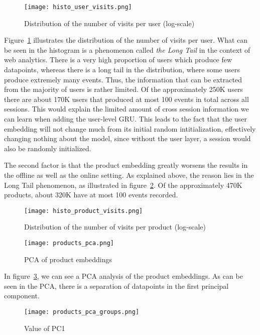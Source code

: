 \begin{figure}[t]
	\centering
	\captionsetup{width=0.8\textwidth}
    \texttt{[image: histo\_user\_visits.png]}
    \caption{Distribution of the number of visits per user (log-scale)}
    \label{fig:histo_user_events}
\end{figure}
Figure~\ref{fig:histo_user_events} illustrates the distribution of the number of visits per user.
What can be seen in the histogram is a phenomenon called \emph{the Long Tail} in the context of web analytics.
There is a very high proportion of users which produce few datapoints, whereas there is a long tail in the distribution, where some users produce extremely many events.
Thus, the information that can be extracted from the majority of users is rather limited.
Of the approximately 250K users there are about 170K users that produced at most 100 events in total across all sessions.
This would explain the limited amount of cross session information we can learn when adding the user-level GRU.
This leads to the fact that the user embedding will not change much from its initial random intitialization, effectively changing nothing about the model, since without the user layer, a session would also be randomly initialized.
\par
The second factor is that the product embedding greatly worsens the results in the offline as well as the online setting.
As explained above, the reason lies in the Long Tail phenomenon, as illustrated in figure~\ref{fig:histo_product_events}.
Of the approximately 470K products, about 320K have at most 100 events recorded.
\begin{figure}[t]
	\centering
	\captionsetup{width=0.8\textwidth}
    \texttt{[image: histo\_product\_visits.png]}
    \caption{Distribution of the number of visits per product (log-scale)}
    \label{fig:histo_product_events}
\end{figure}
\begin{figure}[t]
	\centering
	\captionsetup{width=0.8\textwidth}
    \texttt{[image: products\_pca.png]}
    \caption{PCA of product embeddings}
    \label{fig:products_pca}
\end{figure}
In figure~\ref{fig:products_pca}, we can see a PCA analysis of the product embeddings.
As can be seen in the PCA, there is a separation of datapoints in the first principal component.
\begin{figure}[t]
	\centering
	\captionsetup{width=0.8\textwidth}
    \texttt{[image: products\_pca\_groups.png]}
    \caption{Value of PC1}
    \label{fig:products_pca_groups}
\end{figure}
